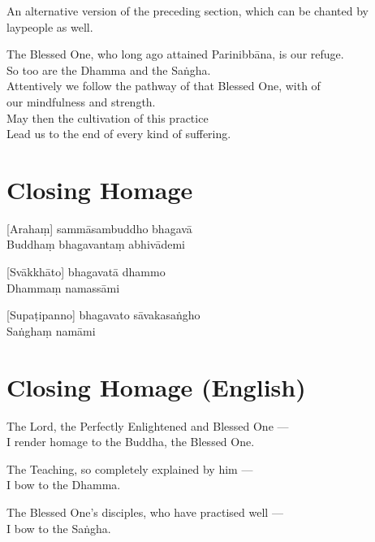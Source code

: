 \begin{instruction}
  An alternative version of the preceding section, which can be chanted by laypeople as well.
\end{instruction}

The Blessed One, who long ago attained Parinibbāna, is our refuge.\\
So too are the Dhamma and the Saṅgha.\\
Attentively we follow the pathway of that Blessed One, with  of \\our mindfulness and strength.\\
May then the cultivation of this practice\\
Lead us to the end of every kind of suffering.

\section*{Closing Homage}

[Arahaṃ] sammāsambuddho bhagavā\\
Buddhaṃ bhagavantaṃ abhivādemi

[Svākkhāto] bhagavatā dhammo\\
Dhammaṃ namassāmi

[Supaṭipanno] bhagavato sāvakasaṅgho\\
Saṅghaṃ namāmi

\section*{Closing Homage (English)}

The Lord, the Perfectly Enlightened and Blessed One ---\\
I render homage to the Buddha, the Blessed One.

The Teaching, so completely explained by him ---\\
I bow to the Dhamma.

The Blessed One's disciples, who have practised well ---\\
I bow to the Saṅgha.

